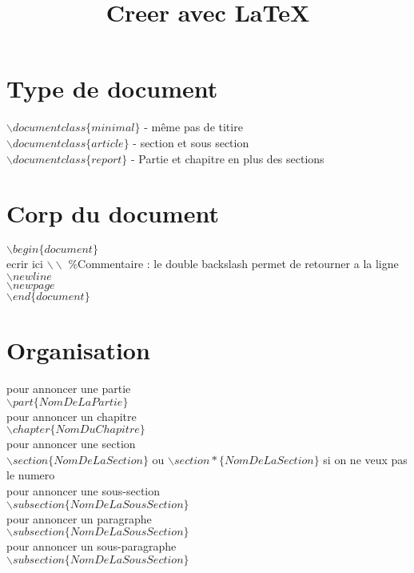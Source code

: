 \documentclass{article}
\title{Creer avec \LaTeX}
\begin{document}
	\maketitle
	\newpage
	\tableofcontents
	\newpage
	\section*{Type de document}
		$\backslash documentclass\{minimal\} $
		- même pas de titire\\ %
		$\backslash documentclass\{article\}$
		- section et sous section\\
		$\backslash documentclass\{report\} $
		- Partie et chapitre en plus des sections\\
	\section*{Corp du document}
		$\backslash begin\{document\}$ \\
		ecrir ici 
		$\backslash \backslash$ \%Commentaire : le double backslash permet de retourner a la ligne\\
		$\backslash newline$ \\
		$\backslash newpage$ \\
		$\backslash end\{document\}$ \\
	\section*{Organisation}
		pour annoncer une partie\\
		$\backslash part\{Nom De La Partie\}$ \\
		\newline
		pour annoncer un chapitre\\
		$\backslash chapter\{Nom Du Chapitre\}$ \\
		\newline
		pour annoncer une section\\
		$\backslash section\{Nom De La Section\}$ ou  $\backslash section*\{Nom De La Section\}$ si on ne veux pas le numero \\
		\newline
		pour annoncer une sous-section\\
		$\backslash subsection\{Nom De La Sous Section\}$ \\
		\newline
		pour annoncer un paragraphe\\
		$\backslash subsection\{Nom De La Sous Section\}$ \\
		\newline
		pour annoncer un sous-paragraphe\\
		$\backslash subsection\{Nom De La Sous Section\}$ 
\end{document}
